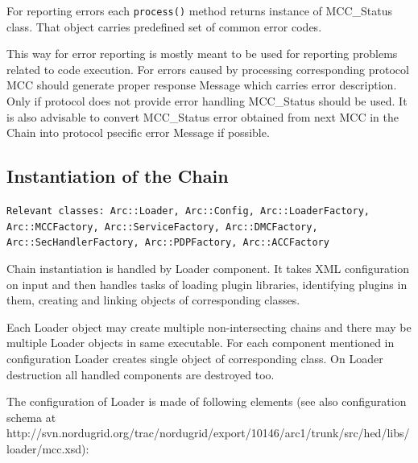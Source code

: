 \documentclass{book}
\begin{document}
For reporting errors each \texttt{process()} method returns instance of MCC\_Status class. That object carries predefined set of common error codes.

This way for error reporting is mostly meant to be used for reporting problems related to code execution. For errors caused by processing corresponding protocol MCC should generate proper response Message which carries error description. Only if protocol does not provide error handling MCC\_Status should be used. It is also advisable to convert MCC\_Status error obtained from next MCC in the Chain into protocol psecific error Message if possible.


\subsection{Instantiation of the Chain}

\texttt{Relevant classes: Arc::Loader, Arc::Config, Arc::LoaderFactory, Arc::MCCFactory, Arc::ServiceFactory, Arc::DMCFactory, Arc::SecHandlerFactory, Arc::PDPFactory, Arc::ACCFactory}

Chain instantiation is handled by Loader component. It takes XML configuration on input and then handles tasks of loading plugin libraries, identifying plugins in them, creating and linking objects of corresponding classes.

Each Loader object may create multiple non-intersecting chains and there may be multiple Loader objects in same executable. For each component mentioned in configuration Loader creates single object of corresponding class. On Loader destruction all handled components are destroyed too.

The configuration of Loader is made of following elements (see also configuration schema at http://svn.nordugrid.org/trac/nordugrid/export/10146/arc1/trunk/src/hed/libs/loader/mcc.xsd):
\end{document}
